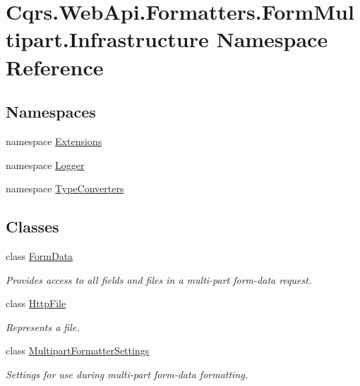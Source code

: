 \hypertarget{namespaceCqrs_1_1WebApi_1_1Formatters_1_1FormMultipart_1_1Infrastructure}{}\section{Cqrs.\+Web\+Api.\+Formatters.\+Form\+Multipart.\+Infrastructure Namespace Reference}
\label{namespaceCqrs_1_1WebApi_1_1Formatters_1_1FormMultipart_1_1Infrastructure}
\subsection*{Namespaces}
\begin{DoxyCompactItemize}
\item 
namespace \hyperlink{namespaceCqrs_1_1WebApi_1_1Formatters_1_1FormMultipart_1_1Infrastructure_1_1Extensions}{Extensions}
\item 
namespace \hyperlink{namespaceCqrs_1_1WebApi_1_1Formatters_1_1FormMultipart_1_1Infrastructure_1_1Logger}{Logger}
\item 
namespace \hyperlink{namespaceCqrs_1_1WebApi_1_1Formatters_1_1FormMultipart_1_1Infrastructure_1_1TypeConverters}{Type\+Converters}
\end{DoxyCompactItemize}
\subsection*{Classes}
\begin{DoxyCompactItemize}
\item 
class \hyperlink{classCqrs_1_1WebApi_1_1Formatters_1_1FormMultipart_1_1Infrastructure_1_1FormData}{Form\+Data}
\begin{DoxyCompactList}\small\item\em Provides access to all fields and files in a multi-\/part form-\/data request. \end{DoxyCompactList}\item 
class \hyperlink{classCqrs_1_1WebApi_1_1Formatters_1_1FormMultipart_1_1Infrastructure_1_1HttpFile}{Http\+File}
\begin{DoxyCompactList}\small\item\em Represents a file. \end{DoxyCompactList}\item 
class \hyperlink{classCqrs_1_1WebApi_1_1Formatters_1_1FormMultipart_1_1Infrastructure_1_1MultipartFormatterSettings}{Multipart\+Formatter\+Settings}
\begin{DoxyCompactList}\small\item\em Settings for use during multi-\/part form-\/data formatting. \end{DoxyCompactList}\end{DoxyCompactItemize}
